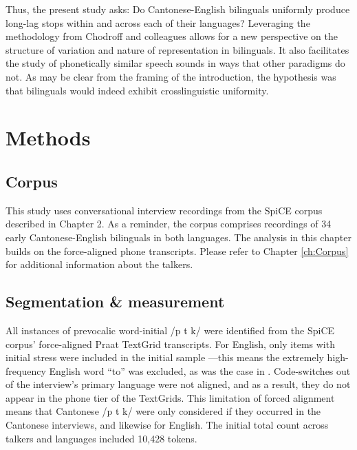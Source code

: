 Thus, the present study asks: Do Cantonese-English bilinguals uniformly produce long-lag stops within and across each of their languages? Leveraging the methodology from Chodroff and colleagues \citep{chodroff_2017_structure, chodroff_2018_predictability, chodroff_2019_l2} allows for a new perspective on the structure of variation and nature of representation in bilinguals. It also facilitates the study of phonetically similar speech sounds in ways that other paradigms do not. As may be clear from the framing of the introduction, the hypothesis was that bilinguals would indeed exhibit crosslinguistic uniformity.

\section{Methods}

\subsection{Corpus}
This study uses conversational interview recordings from the SpiCE corpus described in Chapter 2. As a reminder, the corpus comprises recordings of 34 early Cantonese-English bilinguals in both languages. The analysis in this chapter builds on the force-aligned phone transcripts. Please refer to Chapter \ref{ch:Corpus} for additional information about the talkers. 

\subsection{Segmentation \& measurement}

All instances of prevocalic word-initial /p t k/ were identified from the SpiCE corpus' force-aligned Praat TextGrid transcripts. For English, only items with initial stress were included in the initial sample \citep{lisker_1967_some}---this means the extremely high-frequency English word ``to'' was excluded, as was the case in \citet{chodroff_2017_structure}. Code-switches out of the interview's primary language were not aligned, and as a result, they do not appear in the phone tier of the TextGrids. This limitation of forced alignment means that Cantonese /p t k/ were only considered if they occurred in the Cantonese interviews, and likewise for English. The initial total count across talkers and languages included 10,428 tokens. 

